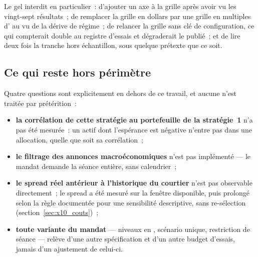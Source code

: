 Le gel interdit en particulier~: d'ajouter un axe à la grille après avoir vu
les vingt-sept résultats~; de remplacer la grille en dollars par une grille
en multiples d' au vu de la dérive de régime~; de relancer la grille
sans clé de configuration, ce qui compterait double au registre d'essais et
dégraderait le  publié~; et de lire deux fois la tranche hors
échantillon, sous quelque prétexte que ce soit.

\subsection{Ce qui reste hors périmètre}

Quatre questions sont explicitement en dehors de ce travail, et aucune
n'est traitée par prétérition~:

\begin{itemize}
  \item \textbf{la corrélation de cette stratégie au portefeuille de la
  stratégie~1} n'a pas été mesurée~: un actif dont l'espérance est négative
  n'entre pas dans une allocation, quelle que soit sa corrélation~;
  \item \textbf{le filtrage des annonces macroéconomiques} n'est pas
  implémenté --- le mandat demande la séance entière, sans calendrier~;
  \item \textbf{le spread réel antérieur à l'historique du courtier} n'est pas
  observable directement~; le spread a été mesuré sur la fenêtre disponible,
  puis prolongé selon la règle documentée pour une sensibilité descriptive,
  sans re-sélection (section~\ref{sec:x10_couts})~;
  \item \textbf{toute variante du mandat} --- niveaux en , scénario
  unique, restriction de séance --- relève d'une autre spécification et d'un
  autre budget d'essais, jamais d'un ajustement de celui-ci.
\end{itemize}
